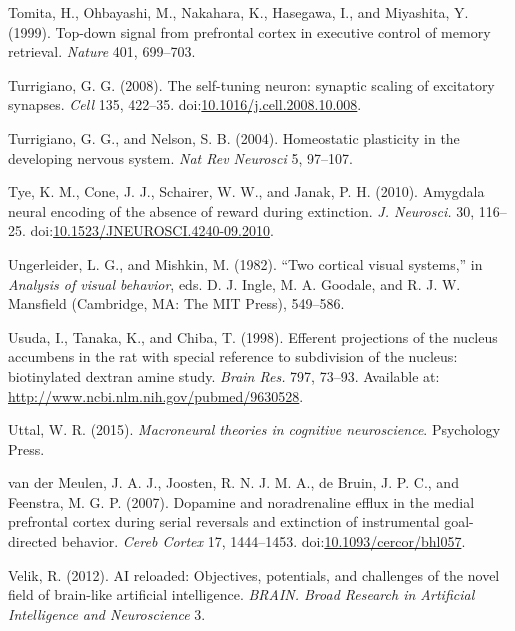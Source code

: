\documentclass[
  11pt,
  a4paper,
]{scrbook}
\newlength{\cslhangindent}
\newenvironment{CSLReferences}[2] %
 {\begin{list}{}{%
  \setlength{\itemindent}{0pt}
  \setlength{\leftmargin}{0pt}
  \setlength{\parsep}{0pt}
  \ifodd #1
   \setlength{\leftmargin}{\cslhangindent}
   \setlength{\itemindent}{-1\cslhangindent}
  \fi
  \setlength{\itemsep}{#2\baselineskip}}}
 {\end{list}}
\begin{document}
\begin{CSLReferences}{1}{1}
Tomita, H., Ohbayashi, M., Nakahara, K., Hasegawa, I., and Miyashita, Y.
(1999). Top-down signal from prefrontal cortex in executive control of
memory retrieval. \emph{Nature} 401, 699--703.

Turrigiano, G. G. (2008). {The self-tuning neuron: synaptic scaling of
excitatory synapses.} \emph{Cell} 135, 422--35.
doi:\href{https://doi.org/10.1016/j.cell.2008.10.008}{10.1016/j.cell.2008.10.008}.

Turrigiano, G. G., and Nelson, S. B. (2004). Homeostatic plasticity in
the developing nervous system. \emph{Nat Rev Neurosci} 5, 97--107.

Tye, K. M., Cone, J. J., Schairer, W. W., and Janak, P. H. (2010).
{Amygdala neural encoding of the absence of reward during extinction.}
\emph{J. Neurosci.} 30, 116--25.
doi:\href{https://doi.org/10.1523/JNEUROSCI.4240-09.2010}{10.1523/JNEUROSCI.4240-09.2010}.

Ungerleider, L. G., and Mishkin, M. (1982). {``Two cortical visual
systems,''} in \emph{Analysis of visual behavior}, eds. D. J. Ingle, M.
A. Goodale, and R. J. W. Mansfield (Cambridge, MA: The MIT Press),
549--586.

Usuda, I., Tanaka, K., and Chiba, T. (1998). {Efferent projections of
the nucleus accumbens in the rat with special reference to subdivision
of the nucleus: biotinylated dextran amine study.} \emph{Brain Res.}
797, 73--93. Available at:
\url{http://www.ncbi.nlm.nih.gov/pubmed/9630528}.

Uttal, W. R. (2015). \emph{Macroneural theories in cognitive
neuroscience}. Psychology Press.

van der Meulen, J. A. J., Joosten, R. N. J. M. A., de Bruin, J. P. C.,
and Feenstra, M. G. P. (2007). Dopamine and noradrenaline efflux in the
medial prefrontal cortex during serial reversals and extinction of
instrumental goal-directed behavior. \emph{Cereb Cortex} 17, 1444--1453.
doi:\href{https://doi.org/10.1093/cercor/bhl057}{10.1093/cercor/bhl057}.

Velik, R. (2012). AI reloaded: Objectives, potentials, and challenges of
the novel field of brain-like artificial intelligence. \emph{BRAIN.
Broad Research in Artificial Intelligence and Neuroscience} 3.


\end{CSLReferences}
\end{document}
